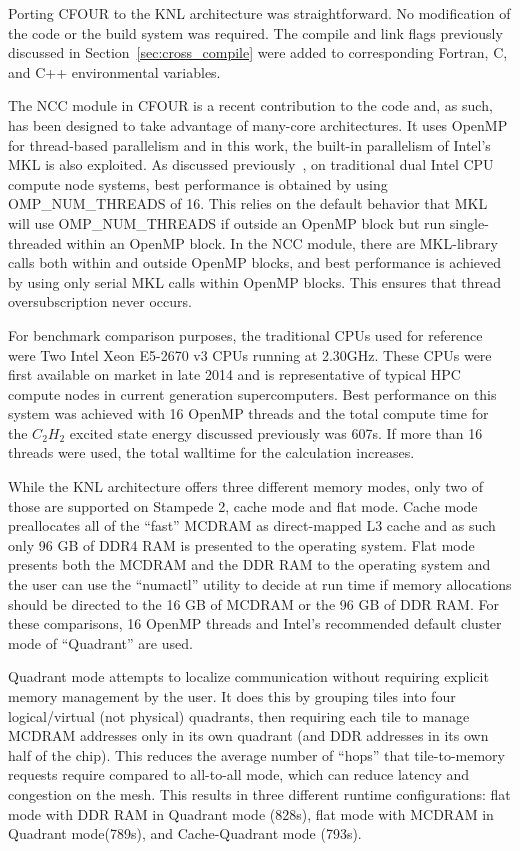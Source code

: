 Porting CFOUR to the KNL architecture was straightforward. No modification of the code or the build
system was required. The compile and link flags previously discussed in Section~\ref{sec:cross_compile}
were added to corresponding Fortran, C, and C++ environmental variables.

The NCC module in CFOUR is a recent contribution to the code and, as such, has been designed to take
advantage of many-core architectures. It uses OpenMP for thread-based parallelism and in this work, the
built-in parallelism of Intel's MKL is also exploited. As discussed previously~\cite{ncc:15},
on traditional dual Intel CPU compute node systems, best performance is obtained 
by using OMP\_NUM\_THREADS of 16. This relies on the default behavior that MKL will use OMP\_NUM\_THREADS 
if outside an OpenMP block but run single-threaded within an OpenMP block. 
In the NCC module, there are MKL-library calls both within and outside OpenMP blocks, and best performance is 
achieved by using only serial MKL calls within OpenMP blocks. This ensures that thread oversubscription never occurs.

For benchmark comparison purposes, the traditional CPUs used for reference were Two Intel Xeon E5-2670 v3 CPUs
running at 2.30GHz. These CPUs were first available on market in late 2014 and is representative of typical HPC 
compute nodes in current generation supercomputers. Best performance on this system was achieved with 
16 OpenMP threads and the total compute time for the $C_2H_2$ excited state energy discussed previously
was 607s.
If more than 16 threads were used, the total walltime for the calculation increases. 

While the KNL architecture offers three different memory modes, only two of those are supported on Stampede 2,
cache mode and flat mode. Cache mode preallocates all of the ``fast'' MCDRAM as direct-mapped L3 cache and
as such only 96 GB of DDR4 RAM is presented to the operating system. Flat mode presents both the MCDRAM and the 
DDR RAM to the operating system and the user can use the ``numactl'' utility to decide at run time if memory 
allocations should be directed to the 16 GB of MCDRAM or the 96 GB of DDR RAM. For these comparisons, 16 OpenMP
threads and Intel's recommended default cluster mode of ``Quadrant'' are used.

Quadrant mode attempts to localize communication without requiring explicit memory management by the user. 
It does this by grouping tiles into four logical/virtual (not physical) quadrants, then requiring each tile 
to manage MCDRAM addresses only in its own quadrant (and DDR addresses in its own half of the chip). 
This reduces the average number of ``hops'' that tile-to-memory requests require compared to all-to-all mode, 
which can reduce latency and congestion on the mesh. This results in three different runtime configurations:
flat mode with DDR RAM in Quadrant mode (828s), flat mode with MCDRAM in Quadrant mode(789s), and
Cache-Quadrant mode (793s). 

